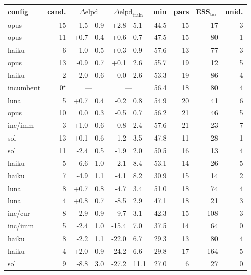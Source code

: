 \documentclass[11pt]{article}
\newcommand{\better}[1]{\textcolor{green!50!black}{#1}}
\newcommand{\worse}[1]{\textcolor{red!75!black}{#1}}
\begin{document}
\begin{table}
\centering
\small
\setlength{\tabcolsep}{4pt}
\begin{tabular}{l r r@{\,$\pm$\,}l r@{\,$\pm$\,}l r r r r}
\toprule
config & cand. & \multicolumn{2}{c}{$\Delta\mathrm{elpd}$} & \multicolumn{2}{c}{$\Delta\mathrm{elpd}_{\mathrm{train}}$} & min & pars &
ESS$_{\mathrm{tail}}$ & unid. \\
\midrule
opus & 15 & -1.5 & 0.9 & +2.8 & 5.1 & 44.5 & 15 & 17 & 3 \\
opus & 11 & +0.7 & 0.4 & +0.6 & 0.7 & 47.5 & 15 & 80 & 1 \\
haiku & 6 & \worse{-1.0} & \worse{0.5} & +0.3 & 0.9 & 57.6 & 13 & 77 & 3 \\
opus & 13 & -0.9 & 0.7 & +0.1 & 2.6 & 55.7 & 19 & 12 & 5 \\
haiku & 2 & \worse{-2.0} & \worse{0.6} & 0.0 & 2.6 & 53.3 & 19 & 86 & 4 \\
incumbent & 0$^{\star}$ & \multicolumn{2}{c}{---} & \multicolumn{2}{c}{---} & 56.4 & 18 & 80 & 4 \\
luna & 5 & +0.7 & 0.4 & -0.2 & 0.8 & 54.9 & 20 & 41 & 6 \\
opus & 10 & 0.0 & 0.3 & -0.5 & 0.7 & 56.2 & 21 & 46 & 5 \\
inc/imm & 3 & +1.0 & 0.6 & -0.8 & 2.4 & 57.6 & 21 & 23 & 7 \\
sol & 13 & +0.1 & 0.6 & -1.2 & 3.5 & 47.8 & 11 & 28 & 1 \\
sol & 11 & \worse{-2.4} & \worse{0.5} & -1.9 & 2.0 & 50.5 & 16 & 13 & 4 \\
haiku & 5 & \worse{-6.6} & \worse{1.0} & -2.1 & 8.4 & 53.1 & 14 & 26 & 5 \\
haiku & 7 & \worse{-4.9} & \worse{1.1} & -4.1 & 8.2 & 30.9 & 15 & 14 & 2 \\
luna & 8 & +0.7 & 0.8 & -4.7 & 3.4 & 51.0 & 18 & 74 & 4 \\
luna & 4 & +0.8 & 0.7 & \worse{-8.5} & \worse{2.9} & 47.1 & 18 & 21 & 3 \\
inc/cur & 8 & \worse{-2.9} & \worse{0.9} & \worse{-9.7} & \worse{3.1} & 42.3 & 15 & 108 & 3 \\
inc/imm & 5 & \worse{-2.4} & \worse{1.0} & \worse{-15.4} & \worse{7.0} & 37.5 & 14 & 64 & 0 \\
haiku & 8 & -2.2 & 1.1 & \worse{-22.0} & \worse{6.7} & 29.3 & 13 & 80 & 4 \\
haiku & 4 & \better{+2.0} & \better{0.9} & \worse{-24.2} & \worse{6.6} & 29.8 & 17 & 164 & 5 \\
sol & 9 & \worse{-8.8} & \worse{3.0} & \worse{-27.2} & \worse{11.1} & 27.0 & 6 & 27 & 0 \\

\end{tabular}
\end{table}
\end{document}
